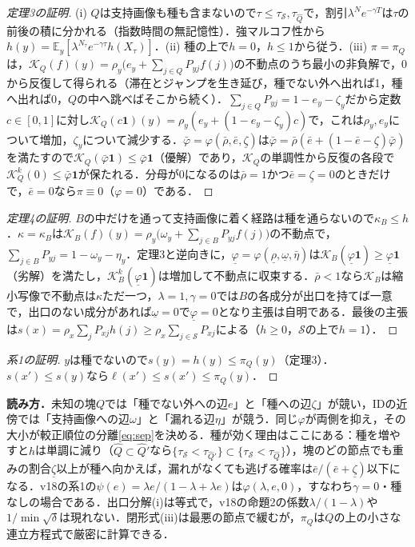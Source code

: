 \documentclass[a4paper,10pt,dvipdfmx]{jsarticle}
\theoremstyle{definition}
\newcommand{\cS}{\mathcal{S}}
\newcommand{\hQ}{\hat{Q}}
\newcommand{\E}{\mathbb{E}}
\begin{document}
\begin{proof}[定理3の証明]
(i) $Q$は支持画像も種も含まないので$\tau\le\tau_{\cS},\tau_{\hQ}$で，割引$\lambda^Ne^{-\gamma T}$は$\tau$の前後の積に分かれる（指数時間の無記憶性）．強マルコフ性から$h(y)=\E_y[\lambda^{N_\tau}e^{-\gamma\tau}h(X_\tau)]$．(ii) 種の上で$h=0$，$h\le1$から従う．(iii) $\pi=\pi_Q$は，$\mathcal{K}_Q(f)(y)=\rho_y\big(e_y+\sum_{j\in Q}P_{yj}f(j)\big)$の不動点のうち最小の非負解で，$0$から反復して得られる（滞在とジャンプを生き延び，種でない外へ出れば1，種へ出れば0，$Q$の中へ跳べばそこから続く）．$\sum_{j\in Q}P_{yj}=1-e_y-\zeta_y$だから定数$c\in[0,1]$に対し$\mathcal{K}_Q(c\mathbf{1})(y)=\rho_y(e_y+(1-e_y-\zeta_y)c)$で，これは$\rho_y,e_y$について増加，$\zeta_y$について減少する．$\bar\varphi=\varphi(\bar\rho,\bar e,\underline{\zeta})$は$\bar\varphi=\bar\rho(\bar e+(1-\bar e-\underline{\zeta})\bar\varphi)$を満たすので$\mathcal{K}_Q(\bar\varphi\mathbf{1})\le\bar\varphi\mathbf{1}$（優解）であり，$\mathcal{K}_Q$の単調性から反復の各段で$\mathcal{K}_Q^k(0)\le\bar\varphi\mathbf{1}$が保たれる．分母が0になるのは$\bar\rho=1$かつ$\bar e=\underline{\zeta}=0$のときだけで，$\bar e=0$なら$\pi\equiv0$（$\varphi=0$）である．
\end{proof}
\begin{proof}[定理4の証明]
$B$の中だけを通って支持画像に着く経路は種を通らないので$\kappa_B\le h$．$\kappa=\kappa_B$は$\mathcal{K}_B(f)(y)=\rho_y\big(\omega_y+\sum_{j\in B}P_{yj}f(j)\big)$の不動点で，$\sum_{j\in B}P_{yj}=1-\omega_y-\eta_y$．定理3と逆向きに，$\underline{\varphi}=\varphi(\underline{\rho},\underline{\omega},\bar\eta)$は$\mathcal{K}_B(\underline{\varphi}\mathbf{1})\ge\underline{\varphi}\mathbf{1}$（劣解）を満たし，$\mathcal{K}_B^k(\underline{\varphi}\mathbf{1})$は増加して不動点に収束する．$\bar\rho<1$なら$\mathcal{K}_B$は縮小写像で不動点は$\kappa$ただ一つ，$\lambda{=}1,\gamma{=}0$では$B$の各成分が出口を持てば一意で，出口のない成分があれば$\underline{\omega}=0$で$\underline{\varphi}=0$となり主張は自明である．最後の主張は$s(x)=\rho_x\sum_jP_{xj}h(j)\ge\rho_x\sum_{j\in\cS}P_{xj}$による（$h\ge0$，$\cS$の上で$h=1$）．
\end{proof}
\begin{proof}[系1の証明]
$y$は種でないので$s(y)=h(y)\le\pi_Q(y)$（定理3）．$s(x')\le s(y)$なら$\ell(x')\le s(x')\le\pi_Q(y)$．
\end{proof}

\textbf{読み方．}未知の塊$Q$では「種でない外への辺$e$」と「種への辺$\zeta$」が競い，IDの近傍では「支持画像への辺$\omega$」と「漏れる辺$\eta$」が競う．同じ$\varphi$が両側を抑え，その大小が較正順位の分離\eqref{eq:sep}を決める．種が効く理由はここにある：種を増やすと$h$は単調に減り（$\hQ\subset\hQ'$なら$\{\tau_{\cS}<\tau_{\hQ'}\}\subset\{\tau_{\cS}<\tau_{\hQ}\}$），塊のどの節点でも重みの割合$\underline{\zeta}$以上が種へ向かえば，漏れがなくても逃げる確率は$\bar e/(\bar e+\underline{\zeta})$以下になる．v18の系1の$\psi(e)=\lambda e/(1-\lambda+\lambda e)$は$\varphi(\lambda,e,0)$，すなわち$\gamma{=}0$・種なしの場合である．出口分解(i)は等式で，v18の命題2の係数$\lambda/(1-\lambda)$や$1/\min\sqrt{\delta}$は現れない．閉形式(iii)は最悪の節点で緩むが，$\pi_Q$は$Q$の上の小さな連立方程式で厳密に計算できる．
\end{document}

